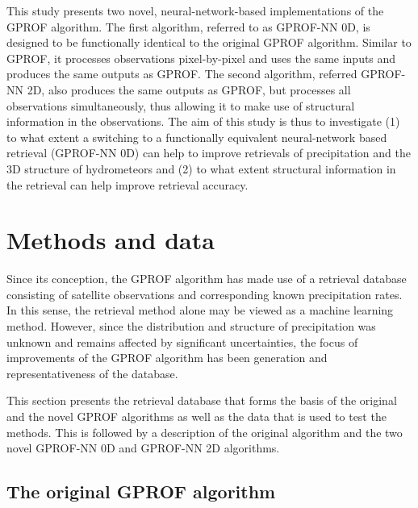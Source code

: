 \documentclass[a4paper,11pt,bibtotoc]{scrartcl}
\begin{document}
This study presents two novel, neural-network-based implementations of the GPROF
algorithm. The first algorithm, referred to as GPROF-NN 0D, is designed to be
functionally identical to the original GPROF algorithm. Similar to GPROF,
it processes observations pixel-by-pixel and  uses the same inputs and
produces the same outputs as GPROF. The second algorithm, referred GPROF-NN 2D,
also produces the same outputs as GPROF, but processes all observations
simultaneously, thus allowing it to make use of structural information in
the observations. The aim of this study is thus to investigate (1) to
what extent a switching to a functionally equivalent neural-network based
retrieval (GPROF-NN 0D) can help to improve retrievals of precipitation
and the 3D structure of hydrometeors and (2) to what extent structural
information in the retrieval can help improve retrieval accuracy.

\section{Methods and data}

Since its conception, the GPROF algorithm has made use of a retrieval
database consisting of satellite observations and corresponding known
precipitation rates. In this sense, the retrieval method alone may be
viewed as a machine learning method. However, since the distribution
and structure of precipitation was unknown and remains affected by
significant uncertainties, the focus of improvements of the GPROF
algorithm has been generation and representativeness of the database.


This section presents the retrieval database that forms the basis of the
original and the novel GPROF algorithms as well as the data that is used
to test the methods. This is followed by a description of the original
algorithm and the two novel GPROF-NN 0D and GPROF-NN 2D algorithms.

\subsection{The original GPROF algorithm}
\end{document}
